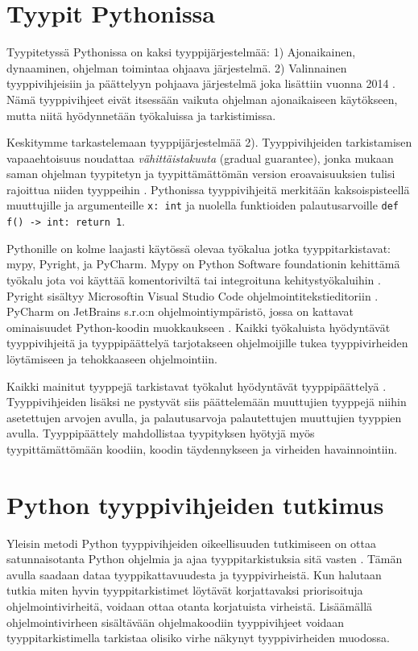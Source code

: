 \begin{otherlanguage}{finnish}
\section*{Tyypit Pythonissa}

Tyypitetyssä Pythonissa on kaksi tyyppijärjestelmää: 1) Ajonaikainen, dynaaminen, ohjelman toimintaa ohjaava järjestelmä. 2) Valinnainen tyyppivihjeisiin ja päättelyyn pohjaava järjestelmä joka lisättiin vuonna 2014 \cite{pep_484}. Nämä tyyppivihjeet eivät itsessään vaikuta ohjelman ajonaikaiseen käytökseen, mutta niitä hyödynnetään työkaluissa ja tarkistimissa.

Keskitymme tarkastelemaan tyyppijärjestelmää 2). Tyyppivihjeiden tarkistamisen vapaaehtoisuus noudattaa \emph{vähittäistakuuta} (gradual guarantee), jonka mukaan saman ohjelman tyypitetyn ja tyypittämättömän version eroavaisuuksien tulisi rajoittua niiden tyyppeihin \cite{siek_refined_gradual_2015}. Pythonissa tyyppivihjeitä merkitään kaksoispisteellä muuttujille ja argumenteille {\tt x: int} ja nuolella funktioiden palautusarvoille {\tt def f() -> int: return 1}.

Pythonille on kolme laajasti käytössä olevaa työkalua jotka tyyppitarkistavat: mypy, Pyright, ja PyCharm. Mypy on Python Software foundationin kehittämä työkalu jota voi käyttää komentoriviltä tai integroituna kehitystyökaluihin \cite{mypy_type_inference}. Pyright sisältyy Microsoftin Visual Studio Code ohjelmointitekstieditoriin \cite{pyright_type_inference}. PyCharm on JetBrains s.r.o:n ohjelmointiympäristö, jossa on kattavat ominaisuudet Python-koodin muokkaukseen \cite{jetbrains_type_hinting_pycharm}. Kaikki työkaluista hyödyntävät tyyppivihjeitä ja tyyppipäättelyä tarjotakseen ohjelmoijille tukea tyyppivirheiden löytämiseen ja tehokkaaseen ohjelmointiin.

Kaikki mainitut tyyppejä tarkistavat työkalut hyödyntävät tyyppipäättelyä \cite{jetbrains_type_hinting_pycharm, mypy_type_inference, pyright_type_inference}. Tyyppivihjeiden lisäksi ne pystyvät siis päättelemään muuttujien tyyppejä niihin asetettujen arvojen avulla, ja palautusarvoja palautettujen muuttujien tyyppien avulla. Tyyppipäättely mahdollistaa tyypityksen hyötyjä myös tyypittämättömään koodiin, koodin täydennykseen ja virheiden havainnointiin.

\section*{Python tyyppivihjeiden tutkimus}
Yleisin metodi Python tyyppivihjeiden oikeellisuuden tutkimiseen on ottaa satunnaisotanta Python ohjelmia ja ajaa tyyppitarkistuksia sitä vasten \cite{di_grazia_evolution_2022, lin_towards_large_scale_2023, rak-amnouykit_taleoftwo_2020, xu_how_well_static_2023}. Tämän avulla saadaan dataa tyyppikattavuudesta ja tyyppivirheistä. Kun halutaan tutkia miten hyvin tyyppitarkistimet löytävät korjattavaksi priorisoituja ohjelmointivirheitä, voidaan ottaa otanta korjatuista virheistä. Lisäämällä ohjelmointivirheen sisältävään ohjelmakoodiin tyyppivihjeet voidaan tyyppitarkistimella tarkistaa olisiko virhe näkynyt tyyppivirheiden muodossa.


\end{otherlanguage}
